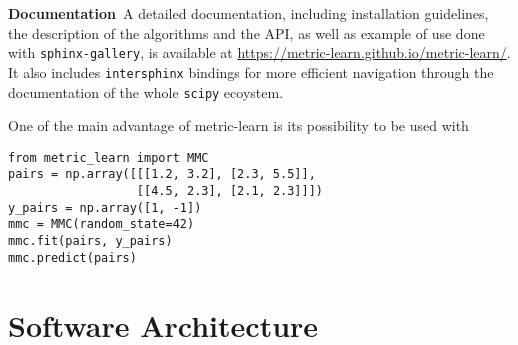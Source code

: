 \documentclass[twoside,11pt]{article}
\begin{document}

\textbf{Documentation} A detailed documentation, including installation guidelines, the description of the algorithms and the API, as well as example of use done with \texttt{sphinx-gallery}, is available at \url{https://metric-learn.github.io/metric-learn/}. It also includes \texttt{intersphinx} bindings for more efficient navigation through the documentation of the whole \texttt{scipy} ecoystem. 



One of the main advantage of metric-learn is its possibility to be used with 

\begin{verbatim}
from metric_learn import MMC
pairs = np.array([[[1.2, 3.2], [2.3, 5.5]],
                  [[4.5, 2.3], [2.1, 2.3]]])
y_pairs = np.array([1, -1])
mmc = MMC(random_state=42)
mmc.fit(pairs, y_pairs)
mmc.predict(pairs)
\end{verbatim}

\section{Software Architecture}

\end{document}
